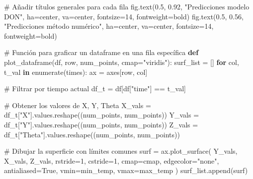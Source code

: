 \documentclass[
  spanish,
  us-letterpaper,
  DIV=11,
  numbers=noendperiod]{scrreprt}
\newenvironment{Shaded}{\begin{snugshade}}{\end{snugshade}}
\newcommand{\BuiltInTok}[1]{\textcolor[rgb]{0.00,0.23,0.31}{#1}}
\newcommand{\CommentTok}[1]{\textcolor[rgb]{0.37,0.37,0.37}{#1}}
\newcommand{\ControlFlowTok}[1]{\textcolor[rgb]{0.00,0.23,0.31}{\textbf{#1}}}
\newcommand{\DecValTok}[1]{\textcolor[rgb]{0.68,0.00,0.00}{#1}}
\newcommand{\FloatTok}[1]{\textcolor[rgb]{0.68,0.00,0.00}{#1}}
\newcommand{\KeywordTok}[1]{\textcolor[rgb]{0.00,0.23,0.31}{\textbf{#1}}}
\newcommand{\NormalTok}[1]{\textcolor[rgb]{0.00,0.23,0.31}{#1}}
\newcommand{\OperatorTok}[1]{\textcolor[rgb]{0.37,0.37,0.37}{#1}}
\newcommand{\StringTok}[1]{\textcolor[rgb]{0.13,0.47,0.30}{#1}}
\newcommand{\VariableTok}[1]{\textcolor[rgb]{0.07,0.07,0.07}{#1}}
\theoremstyle{plain}
\theoremstyle{definition}
\theoremstyle{remark}
\begin{document}
\begin{Shaded}
\begin{Highlighting}[]
\CommentTok{\# Añadir títulos generales para cada fila}
\NormalTok{fig.text(}\FloatTok{0.5}\NormalTok{, }\FloatTok{0.92}\NormalTok{, }\StringTok{"Predicciones modelo DON"}\NormalTok{, ha}\OperatorTok{=}\StringTok{\textquotesingle{}center\textquotesingle{}}\NormalTok{, va}\OperatorTok{=}\StringTok{\textquotesingle{}center\textquotesingle{}}\NormalTok{, fontsize}\OperatorTok{=}\DecValTok{14}\NormalTok{, fontweight}\OperatorTok{=}\StringTok{\textquotesingle{}bold\textquotesingle{}}\NormalTok{)}
\NormalTok{fig.text(}\FloatTok{0.5}\NormalTok{, }\FloatTok{0.56}\NormalTok{, }\StringTok{"Predicciones método numérico"}\NormalTok{, ha}\OperatorTok{=}\StringTok{\textquotesingle{}center\textquotesingle{}}\NormalTok{, va}\OperatorTok{=}\StringTok{\textquotesingle{}center\textquotesingle{}}\NormalTok{, fontsize}\OperatorTok{=}\DecValTok{14}\NormalTok{, fontweight}\OperatorTok{=}\StringTok{\textquotesingle{}bold\textquotesingle{}}\NormalTok{)}

\CommentTok{\# Función para graficar un dataframe en una fila específica}
\KeywordTok{def}\NormalTok{ plot\_dataframe(df, row, num\_points, cmap}\OperatorTok{=}\StringTok{"viridis"}\NormalTok{):}
\NormalTok{    surf\_list }\OperatorTok{=}\NormalTok{ []}
    \ControlFlowTok{for}\NormalTok{ col, t\_val }\KeywordTok{in} \BuiltInTok{enumerate}\NormalTok{(times):}
\NormalTok{        ax }\OperatorTok{=}\NormalTok{ axes[row, col]}
        
        \CommentTok{\# Filtrar por tiempo actual}
\NormalTok{        df\_t }\OperatorTok{=}\NormalTok{ df[df[}\StringTok{"time"}\NormalTok{] }\OperatorTok{==}\NormalTok{ t\_val]}

        \CommentTok{\# Obtener los valores de X, Y, Theta}
\NormalTok{        X\_vals }\OperatorTok{=}\NormalTok{ df\_t[}\StringTok{"X"}\NormalTok{].values.reshape((num\_points, num\_points))}
\NormalTok{        Y\_vals }\OperatorTok{=}\NormalTok{ df\_t[}\StringTok{"Y"}\NormalTok{].values.reshape((num\_points, num\_points))}
\NormalTok{        Z\_vals }\OperatorTok{=}\NormalTok{ df\_t[}\StringTok{"Theta"}\NormalTok{].values.reshape((num\_points, num\_points))}

        \CommentTok{\# Dibujar la superficie con límites comunes}
\NormalTok{        surf }\OperatorTok{=}\NormalTok{ ax.plot\_surface(}
\NormalTok{            Y\_vals, X\_vals, Z\_vals,}
\NormalTok{            rstride}\OperatorTok{=}\DecValTok{1}\NormalTok{, cstride}\OperatorTok{=}\DecValTok{1}\NormalTok{,}
\NormalTok{            cmap}\OperatorTok{=}\NormalTok{cmap,}
\NormalTok{            edgecolor}\OperatorTok{=}\StringTok{"none"}\NormalTok{,}
\NormalTok{            antialiased}\OperatorTok{=}\VariableTok{True}\NormalTok{,}
\NormalTok{            vmin}\OperatorTok{=}\NormalTok{min\_temp,}
\NormalTok{            vmax}\OperatorTok{=}\NormalTok{max\_temp}
\NormalTok{        )}
\NormalTok{        surf\_list.append(surf)}


\end{Highlighting}
\end{Shaded}
\end{document}
